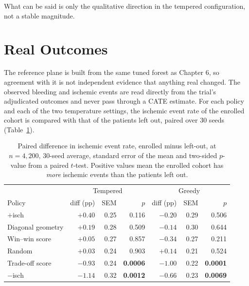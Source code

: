 \vspace{10pt}

What can be said is only the qualitative direction in the tempered configuration, not a
stable magnitude.

\section{Real Outcomes}

The reference plane is built from the same tuned forest as Chapter 6, so agreement with
it is not independent evidence that anything real changed. The observed bleeding and
ischemic events are read directly from the trial's adjudicated outcomes and never pass
through a CATE estimate. For each policy and each of the two temperature
settings, the ischemic event rate of the enrolled cohort is compared with that of the
patients left out, paired over 30 seeds (Table~\ref{tab:ch8-outcomes}).

\begin{table}[h]
\centering
\caption{Paired difference in ischemic event rate, enrolled minus left-out, at
$n=4{,}200$, 30-seed average, standard error of the mean and two-sided $p$-value from a
paired $t$-test. Positive values mean the enrolled cohort has \emph{more} ischemic
events than the patients left out.}
\label{tab:ch8-outcomes}
\begin{tabular}{lrrr|rrr}
\toprule
& \multicolumn{3}{c|}{Tempered} & \multicolumn{3}{c}{Greedy} \\
Policy & diff (pp) & SEM & $p$ & diff (pp) & SEM & $p$ \\
\midrule
$+$isch              & $+0.40$ & 0.25 & 0.116 & $-0.20$ & 0.29 & 0.506 \\
Diagonal geometry     & $+0.19$ & 0.28 & 0.509 & $-0.14$ & 0.30 & 0.644 \\
Win--win score       & $+0.05$ & 0.27 & 0.857 & $-0.34$ & 0.27 & 0.211 \\
Random               & $+0.03$ & 0.24 & 0.903 & $+0.14$ & 0.21 & 0.524 \\
Trade-off score       & $-0.93$ & 0.24 & \textbf{0.0006} & $-1.00$ & 0.22 & \textbf{0.0001} \\
$-$isch              & $-1.14$ & 0.32 & \textbf{0.0012} & $-0.66$ & 0.23 & \textbf{0.0069} \\
\bottomrule
\end{tabular}
\end{table}

